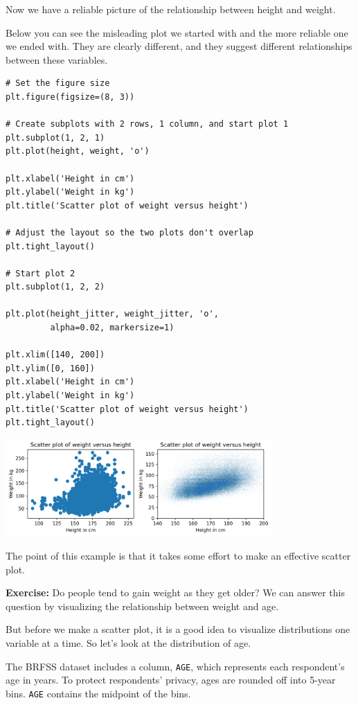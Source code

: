 Now we have a reliable picture of the relationship between height and
weight.

Below you can see the misleading plot we started with and the more
reliable one we ended with. They are clearly different, and they suggest
different relationships between these variables.

\begin{lstlisting}[]
# Set the figure size
plt.figure(figsize=(8, 3))

# Create subplots with 2 rows, 1 column, and start plot 1
plt.subplot(1, 2, 1)
plt.plot(height, weight, 'o')

plt.xlabel('Height in cm')
plt.ylabel('Weight in kg')
plt.title('Scatter plot of weight versus height')

# Adjust the layout so the two plots don't overlap
plt.tight_layout()

# Start plot 2
plt.subplot(1, 2, 2)

plt.plot(height_jitter, weight_jitter, 'o', 
         alpha=0.02, markersize=1)

plt.xlim([140, 200])
plt.ylim([0, 160])
plt.xlabel('Height in cm')
plt.ylabel('Weight in kg')
plt.title('Scatter plot of weight versus height')
plt.tight_layout()
\end{lstlisting}

\begin{center}
\includegraphics[width=4in]{chapters/09_relationships_files/09_relationships_27_0.png}
\end{center}

The point of this example is that it takes some effort to make an
effective scatter plot.

\textbf{Exercise:} Do people tend to gain weight as they get older? We
can answer this question by visualizing the relationship between weight
and age.

But before we make a scatter plot, it is a good idea to visualize
distributions one variable at a time. So let's look at the distribution
of age.

The BRFSS dataset includes a column, \passthrough{\lstinline!AGE!},
which represents each respondent's age in years. To protect respondents'
privacy, ages are rounded off into 5-year bins.
\passthrough{\lstinline!AGE!} contains the midpoint of the bins.

